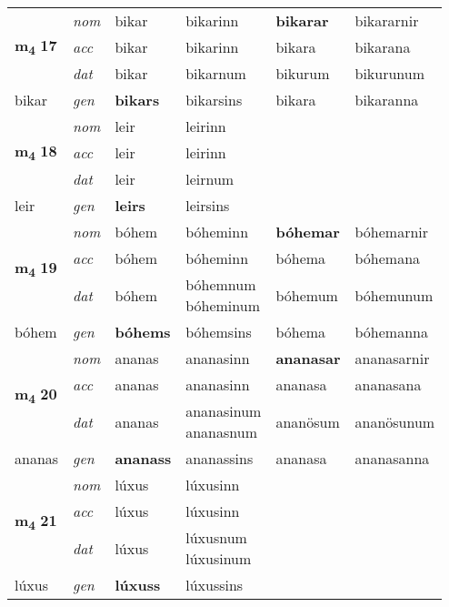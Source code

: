 \begin{longtable}[l]{X>{\footnotesize\itshape}XXXXX}
\multirow{3}{*}{{{\textbf{m{\textsubscript{4}}} \Large{\textbf{17}}}}} & nom & bikar & bikarinn & \textbf{bikarar} & bikararnir \\*
 & acc & bikar & bikarinn & bikara & bikarana \\*
 & dat & bikar & bikarnum & bikurum & bikurunum \\*
 {\footnotesize{bikar}} & gen & \textbf{bikars} & bikarsins & bikara & bikaranna \\
\cmidrule{1-6}

\multirow{3}{*}{{{\textbf{m{\textsubscript{4}}} \Large{\textbf{18}}}}} & nom & leir & leirinn & \textbf{} &  \\*
 & acc & leir & leirinn &  &  \\*
 & dat & leir & leirnum &  &  \\*
 {\footnotesize{leir}} & gen & \textbf{leirs} & leirsins &  &  \\
\cmidrule{1-6}

\multirow{3}{*}{{{\textbf{m{\textsubscript{4}}} \Large{\textbf{19}}}}} & nom & bóhem & bóheminn & \textbf{bóhemar} & bóhemarnir \\*
 & acc & bóhem & bóheminn & bóhema & bóhemana \\*
 & dat & bóhem & \specialcell{bóhemnum\\ bóheminum} & bóhemum & bóhemunum \\*
 {\footnotesize{bóhem}} & gen & \textbf{bóhems} & bóhemsins & bóhema & bóhemanna \\


\multirow{3}{*}{{{\textbf{m{\textsubscript{4}}} \Large{\textbf{20}}}}} & nom & ananas & ananasinn & \textbf{ananasar} & ananasarnir \\*
 & acc & ananas & ananasinn & ananasa & ananasana \\*
 & dat & ananas & \specialcell{ananasinum\\ ananasnum} & ananösum & ananösunum \\*
 {\footnotesize{ananas}} & gen & \textbf{ananass} & ananassins & ananasa & ananasanna \\
\cmidrule{1-6}

\multirow{3}{*}{{{\textbf{m{\textsubscript{4}}} \Large{\textbf{21}}}}} & nom & lúxus & lúxusinn & \textbf{} &  \\*
 & acc & lúxus & lúxusinn &  &  \\*
 & dat & lúxus & \specialcell{lúxusnum\\ lúxusinum} &  &  \\*
 {\footnotesize{lúxus}} & gen & \textbf{lúxuss} & lúxussins &  &  \\
\cmidrule{1-6}


\end{longtable}

